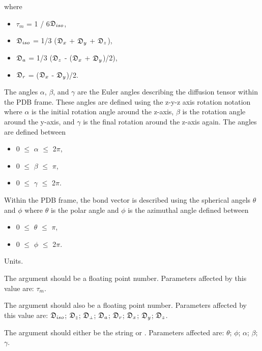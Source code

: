 where

\begin{itemize}
\item[]     $\tau_m$ = 1 / 6$\mathfrak{D}_{iso}$,
\item[]     $\mathfrak{D}_{iso}$ = 1/3 ($\mathfrak{D}_x$ + $\mathfrak{D}_y$ + $\mathfrak{D}_z$),
\item[]     $\mathfrak{D}_a$ = 1/3 ($\mathfrak{D}_z$ - ($\mathfrak{D}_x$ + $\mathfrak{D}_y$)/2),
\item[]     $\mathfrak{D}_r$ = ($\mathfrak{D}_x$ - $\mathfrak{D}_y$)/2.
\end{itemize}

The angles $\alpha$, $\beta$, and $\gamma$ are the Euler angles describing the diffusion tensor
within the PDB frame.  These angles are defined using the z-y-z axis rotation notation where
$\alpha$ is the initial rotation angle around the z-axis, $\beta$ is the rotation angle around the
y-axis, and $\gamma$ is the final rotation around the z-axis again.  The angles are defined
between

\begin{itemize}
\item[]     0 $\le$ $\alpha$ $\le$ 2$\pi$,
\item[]     0 $\le$ $\beta$ $\le$ $\pi$,
\item[]     0 $\le$ $\gamma$ $\le$ 2$\pi$.
\end{itemize}

Within the PDB frame, the bond vector is described using the spherical angels $\theta$ and $\phi$
where $\theta$ is the polar angle and $\phi$ is the azimuthal angle defined between

\begin{itemize}
\item[]     0 $\le$ $\theta$ $\le$ $\pi$,
\item[]     0 $\le$ $\phi$ $\le$ 2$\pi$.
\end{itemize}


Units.

The 
 argument should be a floating point number.  Parameters affected by this
value are:  $\tau_m$.

The 
 argument should also be a floating point number.  Parameters affected by this
value are:  $\mathfrak{D}_{iso}$; $\mathfrak{D}_{\scriptscriptstyle \parallel}$; $\mathfrak{D}_{\scriptscriptstyle \perp}$; $\mathfrak{D}_a$; $\mathfrak{D}_r$; $\mathfrak{D}_x$; $\mathfrak{D}_y$; $\mathfrak{D}_z$.

The 
 argument should either be the string 
 or 
.  Parameters affected
are:  $\theta$; $\phi$; $\alpha$; $\beta$; $\gamma$.



